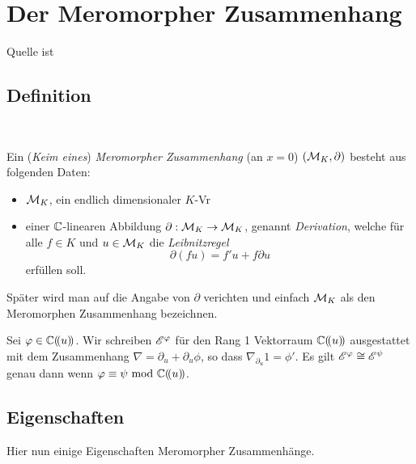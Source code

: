 
\chapter{Der Meromorpher Zusammenhang}
Quelle ist \cite{sabbah_cimpa90}
\section{Definition}~

\begin{defn}
  Ein (\emph{Keim eines}) \emph{Meromorpher Zusammenhang} (an $x=0$)
  $(\mathcal{M}_K,\partial)$ besteht aus folgenden Daten:
  \begin{itemize}
    \item $\mathcal{M}_K$, ein endlich dimensionaler $K$-Vr
    \item einer $\mathbb{C}$-linearen Abbildung $\partial:\mathcal{M}_K\rightarrow \mathcal{M}_K$,
      genannt \emph{Derivation}, welche für alle $f\in K$ und $u\in \mathcal{M}_K$ die
      \emph{Leibnitzregel}
      \begin{equation}\label{eq:Leibnitzregel}
        \partial(fu)=f'u+f\partial u
      \end{equation}
      erfüllen soll.
  \end{itemize}
\end{defn}


\begin{bem}
  Später wird man auf die Angabe von $\partial$ verichten und einfach $\mathcal{M}_K$
  als den Meromorphen Zusammenhang bezeichnen.
\end{bem}

\begin{defn}
  Sei $\varphi\in\mathbb{C}(\!(u)\!)$.
  Wir schreiben $\mathscr{E}^\varphi$ für den Rang 1 Vektorraum $\mathbb{C}(\!(u)\!)$ ausgestattet
  mit dem Zusammenhang $\nabla=\partial_u+\partial_u\phi$, so dass
  $\nabla_{\partial_u}1=\phi'$. Es gilt $\mathscr{E}^\varphi\cong\mathscr{E}^\psi$ genau dann wenn
  $\varphi\equiv\psi\mbox{ mod }\mathbb{C}(\!(u)\!)$.%
\end{defn}

\section{Eigenschaften}
Hier nun einige Eigenschaften Meromorpher Zusammenhänge.

